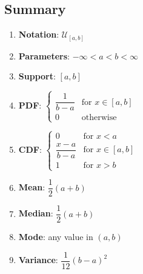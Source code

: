 \subsection{Summary}

\begin{enumerate}
    \item \textbf{Notation}:
    ${\displaystyle {\mathcal {U}}_{[a,b]}}$
    \hfill \cite{wiki/Continuous_uniform_distribution}

    \item \textbf{Parameters}:
    ${\displaystyle -\infty <a<b<\infty }$
    \hfill \cite{wiki/Continuous_uniform_distribution}

    \item \textbf{Support}: $[a, b]$
    \hfill \cite{wiki/Continuous_uniform_distribution}

    \item \textbf{PDF}:
    $
        {\displaystyle {\begin{cases}{\dfrac {1}{b-a}}&{\text{for }}x\in [a,b]\\0&{\text{otherwise}}\end{cases}}}
    $
    \hfill \cite{wiki/Continuous_uniform_distribution, statistics/book/Statistics-for-Data-Scientists/Maurits-Kaptein}

    \item \textbf{CDF}:
    $
        {\displaystyle {\begin{cases}0&{\text{for }}x<a\\{\dfrac {x-a}{b-a}}&{\text{for }}x\in [a,b]\\1&{\text{for }}x>b\end{cases}}}
    $
    \hfill \cite{wiki/Continuous_uniform_distribution}

    \item \textbf{Mean}:
    $
        {\displaystyle {\dfrac {1}{2}}(a+b)}
    $
    \hfill \cite{wiki/Continuous_uniform_distribution}

    \item \textbf{Median}:
    $
        {\displaystyle {\dfrac {1}{2}}(a+b)}
    $
    \hfill \cite{wiki/Continuous_uniform_distribution}

    \item \textbf{Mode}:
    any value in $ {\displaystyle (a,b)} $
    \hfill \cite{wiki/Continuous_uniform_distribution}

    \item \textbf{Variance}:
    $
        {\displaystyle {\dfrac {1}{12}}(b-a)^{2}}
    $
    \hfill \cite{wiki/Continuous_uniform_distribution}


\end{enumerate}
